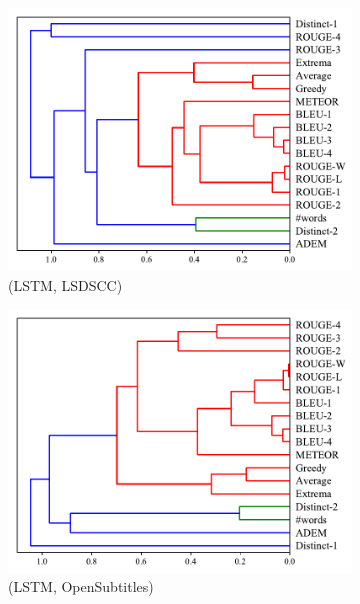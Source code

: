 \begin{figure}[htb]
\begin{subfigure}{0.35\linewidth}
        \includegraphics[width=\linewidth]{figure/plot/hierarchy/v3/pearson/lstm/lsdscc/plot.pdf}
        \caption{(LSTM, LSDSCC)}
    \end{subfigure}%
    \begin{subfigure}{0.35\linewidth}
        \centering
        \includegraphics[width=\linewidth]{figure/plot/hierarchy/v3/pearson/lstm/opensub/plot.pdf}
        \caption{(LSTM, OpenSubtitles)}
    \end{subfigure}%
    \begin{subfigure}{0.35\linewidth}
        \centering

\end{subfigure}
\end{figure}
